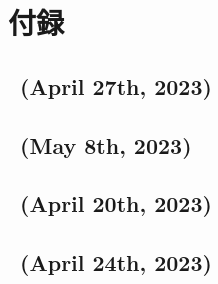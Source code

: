 \chapter*{付録}
\pagestyle{appendixstyle}
\setcounter{section}{0}
\renewcommand{\thelstlisting}{\thesection-\arabic{lstlisting}}
\renewcommand{\thesection}{\Alph{section}}
\newcommand{\secref}[1]{[#1]{#1}}
\makeatletter
{}
\makeatother
{}
\section{\kadaia\ (April 27th, 2023)}






\section{\kadaib\ (May 8th, 2023)}






\section{\ (April 20th, 2023)}
\section{\ (April 24th, 2023)}